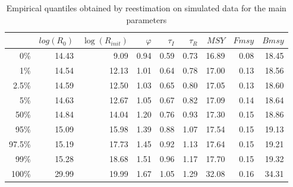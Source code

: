 \begin{table}[ht]
\begin{center}
\begin{tabular}{rrrrrrrrr}
  \hline
 & $log(R_0)$ & $\log(R_{init})$ & $\varphi$ & $\tau_I$ & $\tau_R$ & $MSY$ & $Fmsy$ & $Bmsy$ \\ 
  \hline
0\% & 14.43 & 9.09 & 0.94 & 0.59 & 0.73 & 16.89 & 0.08 & 18.45 \\ 
  1\% & 14.54 & 12.13 & 1.01 & 0.64 & 0.78 & 17.00 & 0.13 & 18.56 \\ 
  2.5\% & 14.59 & 12.50 & 1.03 & 0.65 & 0.80 & 17.05 & 0.13 & 18.60 \\ 
  5\% & 14.63 & 12.67 & 1.05 & 0.67 & 0.82 & 17.09 & 0.14 & 18.64 \\ 
  50\% & 14.84 & 14.04 & 1.20 & 0.76 & 0.93 & 17.30 & 0.15 & 18.86 \\ 
  95\% & 15.09 & 15.98 & 1.39 & 0.88 & 1.07 & 17.54 & 0.15 & 19.13 \\ 
  97.5\% & 15.19 & 17.73 & 1.45 & 0.92 & 1.13 & 17.64 & 0.15 & 19.21 \\ 
  99\% & 15.28 & 18.68 & 1.51 & 0.96 & 1.17 & 17.70 & 0.15 & 19.32 \\ 
  100\% & 29.99 & 19.99 & 1.67 & 1.05 & 1.29 & 32.08 & 0.16 & 34.31 \\ 
   \hline
\end{tabular}
\end{center}
\caption{Empirical quantiles obtained by reestimation on simulated data for the main parameters}
\label{tab:quant}
\end{table}


